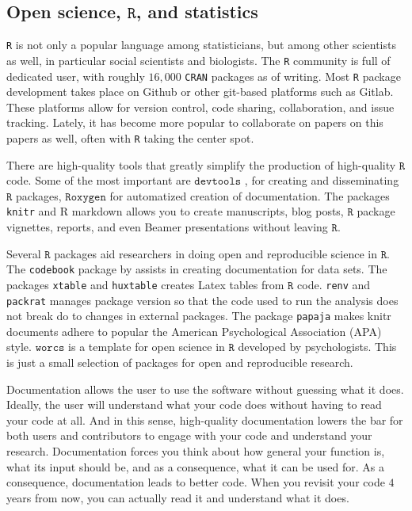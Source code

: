 \subsection{Open science, $\mathtt{R}$, and statistics}

\texttt{R} is not only a popular language among statisticians, but among other scientists as well, in particular social scientists and biologists. The \texttt{R} community is full of dedicated user, with roughly $16,000$ \texttt{CRAN} packages as of writing. Most \texttt{R} package development takes place on Github or other git-based platforms such as Gitlab. These platforms allow for version control, code sharing, collaboration, and issue tracking. Lately, it has become more popular to collaborate on papers on this papers as well, often with \texttt{R} taking the center spot.

There are high-quality tools that greatly simplify the production of high-quality $\mathtt{R}$ code. Some of the most important are $\texttt{devtools}$ \parencite{devtools}, for creating and disseminating $\mathtt{R}$ packages, $\mathtt{Roxygen}$ \parencite{roxygen2} for automatized creation of documentation. The packages \texttt{knitr} \parencite{Xie2014} and R markdown allows you to create manuscripts, blog posts, $\mathtt{R}$ package vignettes, reports, and even Beamer presentations without leaving $\mathtt{R}$.

Several $\mathtt{R}$ packages aid researchers in doing open and reproducible science in $\mathtt{R}$. The \texttt{codebook} package by \cite{Arslan2019-tg} assists in creating documentation for data sets. The packages \texttt{xtable} \parencite{xtable} and \texttt{huxtable} \parencite{huxtable} creates Latex tables from $\mathtt{R}$ code. \texttt{renv} \parencite{renv} and \texttt{packrat} \parencite{packrat} manages package version so that the code used to run the analysis does not break do to changes in external packages. The package \texttt{papaja} \parencite{papaja} makes knitr documents adhere to popular the American Psychological Association (APA) style. $\mathtt{worcs}$ \parencite{Van_Lissa2020-sb} is a template for open science in $\mathtt{R}$ developed by psychologists. This is just a small selection of packages for open and reproducible research.

Documentation allows the user to use the software without guessing what it does. Ideally, the user will understand what your code does without having to read your code at all. And in this sense, high-quality documentation lowers the bar for both users and contributors to engage with your code and understand your research. Documentation forces you think about how general your function is, what its input should be, and as a consequence, what it can be used for. As a consequence, documentation leads to better code. When you revisit your code $4$ years from now, you can actually read it and understand what it does. 

